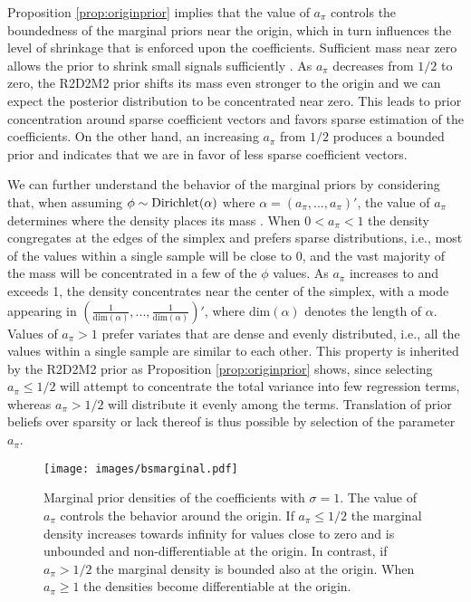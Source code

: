 Proposition \ref{prop:originprior} implies that the value of $a_\pi$ controls the boundedness of the marginal priors near the origin, which in turn influences the level of shrinkage that is enforced upon the coefficients. Sufficient mass near zero allows the prior to shrink small signals sufficiently \citep{BayesPenalizedRegSara}. As $a_\pi$ decreases from $1/2$ to zero, the R2D2M2 prior shifts its mass even stronger to the origin and we can expect the posterior distribution to be concentrated near zero. This leads to prior concentration around sparse coefficient vectors and favors sparse estimation of the coefficients. On the other hand, an increasing $a_\pi$ from $1/2$ produces a bounded prior and indicates that we are in favor of less sparse coefficient vectors.

We can further understand the behavior of the marginal priors by considering that, when assuming $\phi \sim \text{Dirichlet}(\alpha)$ where $\alpha= (a_\pi,..., a_\pi)'$, the value of $a_\pi$ determines where the density places its mass \citep{OnTheDirichlet}. When $0< a_\pi< 1$ the density congregates at the edges of the simplex and prefers sparse distributions, i.e., most of the values within a single sample will be close to 0, and the vast majority of the mass will be concentrated in a few of the $\phi$ values. As $a_\pi$ increases to and exceeds 1, the density concentrates near the center of the simplex, with a mode appearing in $\left(\frac{1}{\text{dim}(\alpha)},..., \frac{1}{\text{dim}(\alpha)}\right)'$, where $\text{dim}(\alpha)$ denotes the length of $\alpha$. Values of $a_\pi>1$ prefer variates that are dense and evenly distributed, i.e., all the values within a single sample are similar to each other. This property is inherited by the R2D2M2 prior as Proposition \ref{prop:originprior} shows, since selecting $a_\pi \leq 1/2$ will attempt to concentrate the total variance into few regression terms, whereas $a_\pi>1/2$ will distribute it evenly among the terms. Translation of prior beliefs over sparsity or lack thereof is thus possible by selection of the parameter $a_\pi$.
 \begin{figure}[t!]
	\centering
	\texttt{[image: images/bsmarginal.pdf]}
	\caption{Marginal prior densities of the coefficients with $\sigma=1$. The value of $a_\pi$ controls the behavior around the origin. If $a_\pi \leq 1/2$ the marginal density increases towards infinity for values close to zero and is unbounded and non-differentiable at the origin. In contrast, if $a_{\pi}>1/2$ the marginal density is bounded also at the origin. When $a_\pi \geq 1$ the densities become differentiable at the origin. }
	\label{fig:priorb}
\end{figure}

